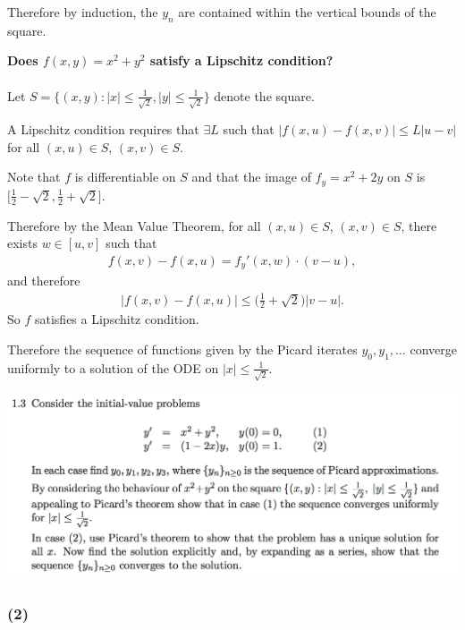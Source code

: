 \documentclass[12pt]{article}
\begin{document}
Therefore by induction, the $y_n$ are contained within the vertical bounds of
the square.


\textbf{Does $f(x, y) = x^2 + y^2$ satisfy a Lipschitz condition?}\\\\
Let $S = \{(x,y): |x| \leq \frac{1}{\sqrt{2}}, |y| \leq \frac{1}{\sqrt{2}}\}$
denote the square.

A Lipschitz condition requires that $\exists L$ such that
$|f(x, u) - f(x, v)| \leq L|u - v|$ for all $(x,u) \in S$, $(x,v) \in S$.

Note that $f$ is differentiable on $S$ and that the image of $f_y = x^2 + 2y$
on $S$ is $\Big[\frac{1}{2} - \sqrt{2}, \frac{1}{2} + \sqrt{2}\Big]$.

Therefore by the Mean Value Theorem, for all $(x,u) \in S$, $(x,v) \in S$,
there exists $w \in [u, v]$ such that
\begin{align*}
  f(x, v) - f(x, u) = f_y'(x, w)\cdot(v - u),
\end{align*}
and therefore
\begin{align*}
  |f(x, v) - f(x, u)| \leq \Big(\frac{1}{2} + \sqrt{2}\Big)|v - u|.
\end{align*}
So $f$ satisfies a Lipschitz condition.

Therefore the sequence of functions given by the Picard iterates
$y_0, y_1, \ldots$ converge uniformly to a solution of the ODE on $|x| \leq \frac{1}{\sqrt{2}}$.

\newpage
\begin{mdframed}
\includegraphics[width=400pt]{img/differential-equations-a1-1-3.png}\\
\end{mdframed}
\subsubsection*{(2)}
\end{document}
